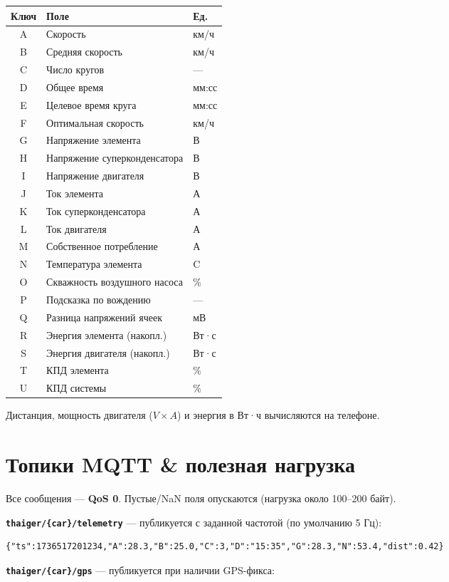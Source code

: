 \documentclass[11pt,a4paper,oneside]{report}
\newcommand{\degC}{\textdegree C}
\newcommand{\code}[1]{\texttt{#1}}
\begin{document}
\begin{tabularx}{\linewidth}{@{}clL@{}}
\toprule
\textbf{Ключ} & \textbf{Поле} & \textbf{Ед.}\\
\midrule
A & Скорость & км/ч\\
B & Средняя скорость & км/ч\\
C & Число кругов & ---\\
D & Общее время & мм:сс\\
E & Целевое время круга & мм:сс\\
F & Оптимальная скорость & км/ч\\
G & Напряжение элемента & В\\
H & Напряжение суперконденсатора & В\\
I & Напряжение двигателя & В\\
J & Ток элемента & А\\
K & Ток суперконденсатора & А\\
L & Ток двигателя & А\\
M & Собственное потребление & А\\
N & Температура элемента & \degC{}\\
O & Скважность воздушного насоса & \%\\
P & Подсказка по вождению & ---\\
Q & Разница напряжений ячеек & мВ\\
R & Энергия элемента (накопл.) & Вт·с\\
S & Энергия двигателя (накопл.) & Вт·с\\
T & КПД элемента & \%\\
U & КПД системы & \%\\
\bottomrule
\end{tabularx}

\medskip
Дистанция, мощность двигателя ($V \times A$) и энергия в Вт·ч вычисляются на
телефоне.

\section{Топики MQTT \& полезная нагрузка}
Все сообщения --- \textbf{QoS 0}. Пустые/NaN поля опускаются (нагрузка около
100--200 байт).

\noindent\textbf{\code{thaiger/\{car\}/telemetry}} --- публикуется с заданной
частотой (по умолчанию 5 Гц):

\begin{lstlisting}
{"ts":1736517201234,"A":28.3,"B":25.0,"C":3,"D":"15:35","G":28.3,"N":53.4,"dist":0.42}
\end{lstlisting}
\noindent\textbf{\code{thaiger/\{car\}/gps}} --- публикуется при наличии GPS-фикса:
\end{document}
